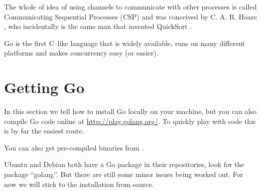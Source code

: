 The whole of idea of using channels to communicate with other processes
is called Communicating Sequential Processes (CSP) and was conceived
by C. A. R. Hoare \cite{hoare}, who incidentally is the same man that
invented QuickSort \cite{quicksort}.

\begin{lbar}[]
Go is the first C--like language that is widely available,
runs on many
different platforms and makes concurrency easy (or easier).
\end{lbar}

\section{Getting Go}
In this section we tell how to install Go locally on your machine, but you can
also compile Go code online at \url{http://play.golang.org/}. To quickly
play with code this is by far the easiest route.

You can also get pre-compiled binaries from \cite{go_install}.

Ubuntu and Debian both have a Go package in their repositories, look for
the package ``golang''. But there are still some minor issues being worked
out. For now we will stick to the installation from source.

